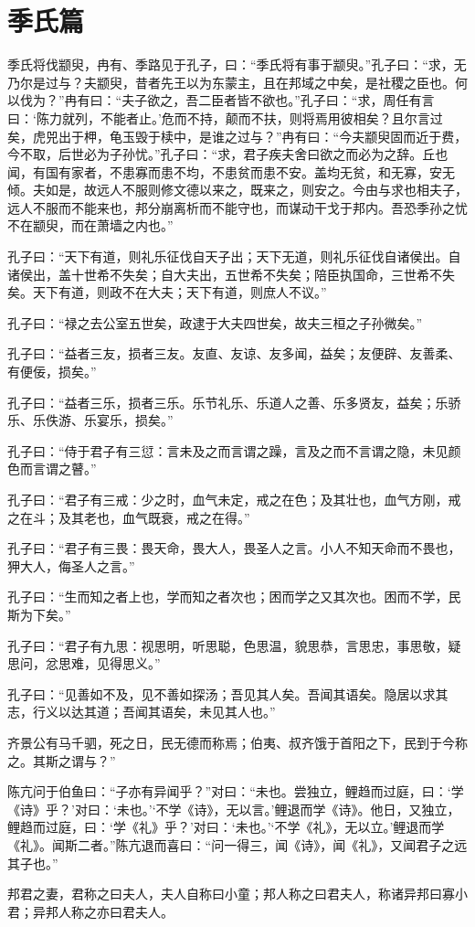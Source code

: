\documentclass[12pt,a4paper]{ctexbook}
\begin{document}
\section{季氏篇}
季氏将伐颛臾，冉有、季路见于孔子，曰：“季氏将有事于颛臾。”孔子曰：“求，无乃尔是过与？夫颛臾，昔者先王以为东蒙主，且在邦域之中矣，是社稷之臣也。何以伐为？”冉有曰：“夫子欲之，吾二臣者皆不欲也。”孔子曰：“求，周任有言曰：‘陈力就列，不能者止。’危而不持，颠而不扶，则将焉用彼相矣？且尔言过矣，虎兕出于柙，龟玉毁于椟中，是谁之过与？”冉有曰：“今夫颛臾固而近于费，今不取，后世必为子孙忧。”孔子曰：“求，君子疾夫舍曰欲之而必为之辞。丘也闻，有国有家者，不患寡而患不均，不患贫而患不安。盖均无贫，和无寡，安无倾。夫如是，故远人不服则修文德以来之，既来之，则安之。今由与求也相夫子，远人不服而不能来也，邦分崩离析而不能守也，而谋动干戈于邦内。吾恐季孙之忧不在颛臾，而在萧墙之内也。”\par
孔子曰：“天下有道，则礼乐征伐自天子出；天下无道，则礼乐征伐自诸侯出。自诸侯出，盖十世希不失矣；自大夫出，五世希不失矣；陪臣执国命，三世希不失矣。天下有道，则政不在大夫；天下有道，则庶人不议。”\par
孔子曰：“禄之去公室五世矣，政逮于大夫四世矣，故夫三桓之子孙微矣。”\par
孔子曰：“益者三友，损者三友。友直、友谅、友多闻，益矣；友便辟、友善柔、有便佞，损矣。”\par
孔子曰：“益者三乐，损者三乐。乐节礼乐、乐道人之善、乐多贤友，益矣；乐骄乐、乐佚游、乐宴乐，损矣。”\par
孔子曰：“侍于君子有三愆：言未及之而言谓之躁，言及之而不言谓之隐，未见颜色而言谓之瞽。”\par
孔子曰：“君子有三戒：少之时，血气未定，戒之在色；及其壮也，血气方刚，戒之在斗；及其老也，血气既衰，戒之在得。”\par
孔子曰：“君子有三畏：畏天命，畏大人，畏圣人之言。小人不知天命而不畏也，狎大人，侮圣人之言。”\par
孔子曰：“生而知之者上也，学而知之者次也；困而学之又其次也。困而不学，民斯为下矣。”\par
孔子曰：“君子有九思：视思明，听思聪，色思温，貌思恭，言思忠，事思敬，疑思问，忿思难，见得思义。”\par
孔子曰：“见善如不及，见不善如探汤；吾见其人矣。吾闻其语矣。隐居以求其志，行义以达其道；吾闻其语矣，未见其人也。”\par
齐景公有马千驷，死之日，民无德而称焉；伯夷、叔齐饿于首阳之下，民到于今称之。其斯之谓与？”\par
陈亢问于伯鱼曰：“子亦有异闻乎？”对曰：“未也。尝独立，鲤趋而过庭，曰：‘学《诗》乎？’对曰：‘未也。’‘不学《诗》，无以言。’鲤退而学《诗》。他日，又独立，鲤趋而过庭，曰：‘学《礼》乎？’对曰：‘未也。’‘不学《礼》，无以立。’鲤退而学《礼》。闻斯二者。”陈亢退而喜曰：“问一得三，闻《诗》，闻《礼》，又闻君子之远其子也。”\par
邦君之妻，君称之曰夫人，夫人自称曰小童；邦人称之曰君夫人，称诸异邦曰寡小君；异邦人称之亦曰君夫人。\par
\end{document}
